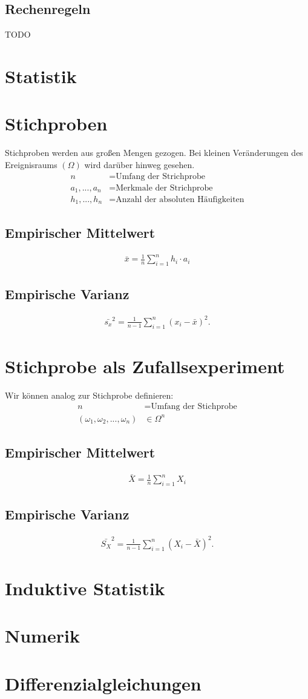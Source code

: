\documentclass[a4paper]{article}
\begin{document}
		\subsection{Rechenregeln}
		TODO
\section{Statistik}	
	\section{Stichproben}
		Stichproben werden aus großen Mengen gezogen. Bei kleinen Veränderungen des Ereignisraums $(\Omega)$ wird darüber hinweg gesehen.
		\begin{align*}
			n &= \text{Umfang der Strichprobe}\\
			a_1, ..., a_n &= \text{Merkmale der Strichprobe}\\
			h_1, ..., h_n &= \text{Anzahl der absoluten Häufigkeiten} 
		\end{align*}
		
		\subsection{Empirischer Mittelwert}
		\begin{align*}
			\bar{x} = \frac{1}{n} \sum_{i = 1}^{n} h_i \cdot a_i
		\end{align*}
		\subsection{Empirische Varianz}
		\begin{align*}
			\bar{s_x}^2 = \frac{1}{n-1}\sum_{i = 1}^{n} (x_i - \bar{x})^2.
		\end{align*}
	\section{Stichprobe als Zufallsexperiment}
		Wir können analog zur Stichprobe definieren:
		\begin{align*}
			n &= \text{Umfang der Stichprobe} \\
			(\omega_1, \omega_2, ..., \omega_n) &\in \Omega^n	
		\end{align*}
		\subsection{Empirischer Mittelwert}
			\begin{align*}
			\bar{X} = \frac{1}{n} \sum_{i = 1}^{n} X_i
			\end{align*}
		\subsection{Empirische Varianz}
			\begin{align*}
			\bar{S_X}^2 = \frac{1}{n-1}\sum_{i = 1}^{n} (X_i - \bar{X})^2.
			\end{align*}	
				
\section{Induktive Statistik}
\section{Numerik}
\section{Differenzialgleichungen}

	
\end{document}

